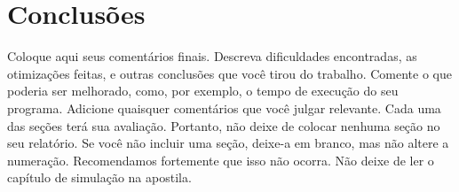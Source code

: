 \chapter{Conclusões}

Coloque aqui seus comentários finais.
Descreva dificuldades encontradas, as otimizações feitas, e outras conclusões que você
tirou do trabalho. Comente o que poderia ser melhorado, como, por exemplo, o tempo de
execução do seu programa. Adicione quaisquer comentários que você julgar relevante.
Cada uma das seções terá sua avaliação. Portanto, não deixe de colocar nenhuma seção no
seu relatório. Se você não incluir uma seção, deixe-a em branco, mas não altere a
numeração. Recomendamos fortemente que isso não ocorra. Não deixe de ler o capítulo de
simulação na apostila.
